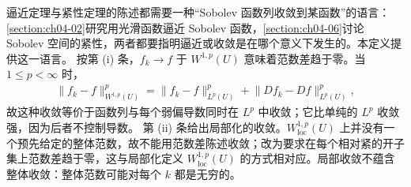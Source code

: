 \documentclass[../../main.tex]{subfiles}%
\begin{document}
\begin{remark}\label{remark:ch04-def-4-3-动机}
逼近定理与紧性定理的陈述都需要一种“Sobolev 函数列收敛到某函数”的语言：\cref{section:ch04-02}研究用光滑函数逼近 Sobolev 函数，\cref{section:ch04-06}讨论 Sobolev 空间的紧性，两者都要指明逼近或收敛是在哪个意义下发生的。本定义提供这一语言。%
按第 (i) 条，$f_k\to f$ 于 $W^{1,p}(U)$ 意味着范数差趋于零。当 $1\leqslant p<\infty$ 时，
\begin{align*}
\lVert f_k-f\rVert_{W^{1,p}(U)}^{p}=\lVert f_k-f\rVert_{L^{p}(U)}^{p}+\lVert Df_k-Df\rVert_{L^{p}(U)}^{p},
\end{align*}
故这种收敛等价于函数列与每个弱偏导数同时在 $L^{p}$ 中收敛；它比单纯的 $L^{p}$ 收敛强，因为后者不控制导数。
第 (ii) 条给出局部化的收敛。$W^{1,p}_{\mathrm{loc}}(U)$ 上并没有一个预先给定的整体范数，故不能用范数差陈述收敛；改为要求在每个相对紧的开子集上范数差趋于零，这与局部化定义 $W^{1,p}_{\mathrm{loc}}(U)$ 的方式相对应。局部收敛不蕴含整体收敛：整体范数可能对每个 $k$ 都是无穷的。
\end{remark}
\end{document}
